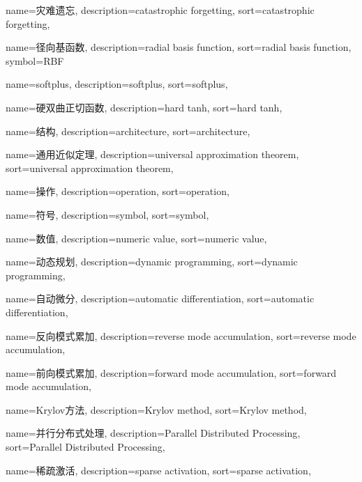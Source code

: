 {
  name=灾难遗忘,
  description={catastrophic forgetting},
  sort={catastrophic forgetting},
}

{
  name=径向基函数,
  description={radial basis function},
  sort={radial basis function},
  symbol={RBF}
}

{
  name=softplus,
  description={softplus},
  sort={softplus},
}

{
  name=硬双曲正切函数,
  description={hard tanh},
  sort={hard tanh},
}

{
  name=结构,
  description={architecture},
  sort={architecture},
}

{
  name=通用近似定理, %
  description={universal approximation theorem},
  sort={universal approximation theorem},
}

{
  name=操作,
  description={operation},
  sort={operation},
}

{
  name=符号,
  description={symbol},
  sort={symbol},
}



{
  name=数值,
  description={numeric value},
  sort={numeric value},
}

{
  name=动态规划,
  description={dynamic programming},
  sort={dynamic programming},
}

{
  name=自动微分,
  description={automatic differentiation},
  sort={automatic differentiation},
}

{
  name=反向模式累加,
  description={reverse mode accumulation},
  sort={reverse mode accumulation},
}

{
  name=前向模式累加,
  description={forward mode accumulation},
  sort={forward mode accumulation},
}

{
  name=Krylov方法,
  description={Krylov method},
  sort={Krylov method},
}

{
  name=并行分布式处理,
  description={Parallel Distributed Processing},
  sort={Parallel Distributed Processing},
}

{
  name=稀疏激活,
  description={sparse activation},
  sort={sparse activation},
}

